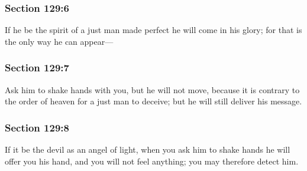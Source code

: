 	\subsubsection{Section 129:6} %
		\label{DC129-6}

		If he be the spirit of a just man made perfect he will come in his glory; for that is the only way he can appear---


	\subsubsection{Section 129:7} %
		\label{DC129-7}

		Ask him to shake hands with you, but he will not move, because it is contrary to the order of heaven for a just man to deceive; but he will still deliver his message.


	\subsubsection{Section 129:8} %
		\label{DC129-8}

		If it be the devil as an angel of light, when you ask him to shake hands he will offer you his hand, and you will not feel anything; you may therefore detect him.


